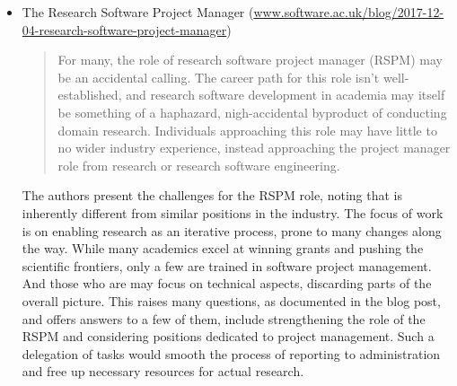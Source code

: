 \documentclass[11pt,letterpaper]{article}
\begin{document}
\begin{itemize}
\item The Research Software Project Manager (\href{https://www.software.ac.uk/blog/2017-12-04-research-software-project-manager}{www.software.ac.uk/blog/2017-12-04-research-software-project-manager})
\begin{quote}
For many, the role of research software project manager (RSPM) may be an accidental calling. The career path for this role isn’t well-established, and research software development in academia may itself be something of a haphazard, nigh-accidental byproduct of conducting domain research. Individuals approaching this role may have little to no wider industry experience, instead approaching the project manager role from research or research software engineering.
\end{quote}
The authors present the challenges for the RSPM role, noting that is inherently different from similar positions in the industry. The focus of work is on enabling research as an iterative process, prone to many changes along the way. While many academics excel at winning grants and pushing the scientific frontiers, only a few are trained in software project management. And those who are may focus on technical aspects, discarding parts of the overall picture. This raises many questions, as documented in the blog post, and offers answers to a few of them, include strengthening the role of the RSPM and considering positions dedicated to project management. Such a delegation of tasks would smooth the process of reporting to administration and free up necessary resources for actual research. 



\end{itemize}
\end{document}
